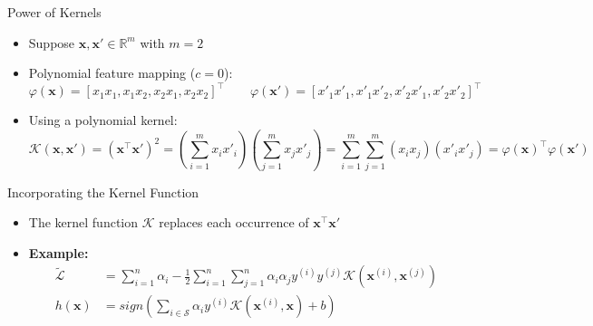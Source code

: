 \begin{frame}{Power of Kernels}{}
	\begin{itemize}
		\item Suppose $\bm{x}, \bm{x'} \in \mathbb{R}^m$ with $m = 2$
		\item Polynomial feature mapping ($c = 0$):
		\vspace*{-1.5mm}
		\begin{equation}
			\varphi(\bm{x}) = [x_1 x_1, x_1 x_2, x_2 x_1, x_2 x_2]^{\intercal} \qquad
			\varphi(\bm{x'}) = [x'_1 x'_1, x'_1 x'_2, x'_2 x'_1, x'_2 x'_2]^{\intercal}
		\end{equation}
		\item Using a polynomial kernel:
		{\scriptsize
		\begin{equation}
			\mathcal{K}(\bm{x}, \bm{x'}) 
				= (\bm{x}^{\intercal} \bm{x'})^2
				= \left( \sum_{i=1}^m x_i x'_i \right) \left( \sum_{j=1}^m x_j x'_j \right)
				= \sum_{i=1}^m \sum_{j=1}^m (x_i x_j) (x'_i x'_j) = \varphi(\bm{x})^{\intercal} \varphi(\bm{x'})
		\end{equation}}
	\end{itemize}
	
	\vspace*{-3mm}
	\begin{boxBlueNoFrame}
		\footnotesize
	\end{boxBlueNoFrame}
\end{frame}


\begin{frame}{Incorporating the Kernel Function}{}
	\begin{itemize}
		\item The kernel function $\mathcal{K}$ replaces each occurrence of $\bm{x}^{\intercal}\bm{x'}$
		\item \textbf{Example:}
		\begin{align}
			\widetilde{\mathcal{L}} 
					&= \sum_{i=1}^n \alpha_i  - \frac{1}{2} \sum_{i=1}^n \sum_{j=1}^n
						\alpha_i \alpha_j y^{(i)} y^{(j)} \mathcal{K}(\bm{x}^{(i)}, \bm{x}^{(j)}) \\[4mm]
			h(\bm{x}) 	&= sign\left( \sum_{i \in \mathcal{S}} \alpha_i y^{(i)} \mathcal{K}(\bm{x}^{(i)}, \bm{x}) + b \right)
		\end{align}
	\end{itemize}
\end{frame}


